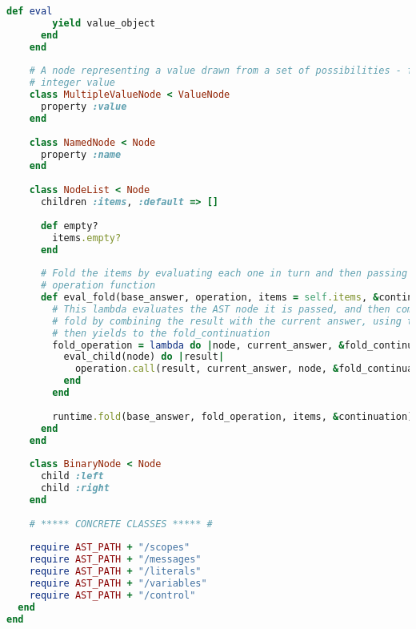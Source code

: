 \begin{lstlisting}[title={\small\Helvetica ast/ast.rb},language=Ruby]
      def eval
        yield value_object
      end
    end
    
    # A node representing a value drawn from a set of possibilities - for example a string or
    # integer value
    class MultipleValueNode < ValueNode
      property :value
    end
    
    class NamedNode < Node
      property :name
    end
    
    class NodeList < Node
      children :items, :default => []
      
      def empty?
        items.empty?
      end
      
      # Fold the items by evaluating each one in turn and then passing the evaluated object to an
      # operation function
      def eval_fold(base_answer, operation, items = self.items, &continuation)
        # This lambda evaluates the AST node it is passed, and then computes the next answer for the
        # fold by combining the result with the current answer, using the operation provided, which
        # then yields to the fold_continuation
        fold_operation = lambda do |node, current_answer, &fold_continuation|
          eval_child(node) do |result|
            operation.call(result, current_answer, node, &fold_continuation)
          end
        end
        
        runtime.fold(base_answer, fold_operation, items, &continuation)
      end
    end
    
    class BinaryNode < Node
      child :left
      child :right
    end
    
    # ***** CONCRETE CLASSES ***** #
    
    require AST_PATH + "/scopes"
    require AST_PATH + "/messages"
    require AST_PATH + "/literals"
    require AST_PATH + "/variables"
    require AST_PATH + "/control"
  end
end

\end{lstlisting}
